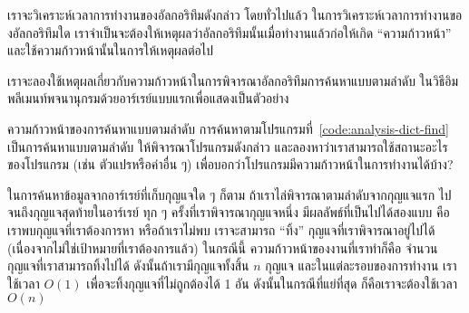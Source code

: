 เรา{\wbr}จะ{\wbr}วิเคราะห์{\wbr}เวลา{\wbr}การ{\wbr}ทำงาน{\wbr}ของ{\wbr}อัล{\wbr}กอ{\wbr}ริ{\wbr}ทึม{\wbr}ดังกล่าว โดย{\wbr}ทั่วไป{\wbr}แล้ว{\wbr}
ใน{\wbr}การ{\wbr}วิเคราะห์{\wbr}เวลา{\wbr}การ{\wbr}ทำงาน{\wbr}ของ{\wbr}อัล{\wbr}กอ{\wbr}ริ{\wbr}ทึม{\wbr}ใด{\wbr}
เรา{\wbr}จำเป็น{\wbr}จะ{\wbr}ต้อง{\wbr}ให้{\wbr}เหตุผล{\wbr}ว่า{\wbr}อัล{\wbr}กอ{\wbr}ริ{\wbr}ทึม{\wbr}นั้น{\wbr}เมื่อ{\wbr}ทำงาน{\wbr}แล้ว{\wbr}ก่อ{\wbr}ให้{\wbr}เกิด ``ความ{\wbr}ก้าวหน้า''
และ{\wbr}ใช้{\wbr}ความ{\wbr}ก้าวหน้า{\wbr}นั้น{\wbr}ใน{\wbr}การ{\wbr}ให้{\wbr}เหตุผล{\wbr}ต่อไป{\wbr}

เรา{\wbr}จะ{\wbr}ลอง{\wbr}ใช้{\wbr}เหตุผล{\wbr}เกี่ยวกับ{\wbr}ความ{\wbr}ก้าวหน้า{\wbr}ใน{\wbr}การ{\wbr}พิจารณา{\wbr}อัล{\wbr}กอ{\wbr}ริ{\wbr}ทึม{\wbr}การ{\wbr}ค้นหา{\wbr}แบบ{\wbr}ตาม{\wbr}ลำดับ{\wbr}
ใน{\wbr}วิธี{\wbr}อิม{\wbr}พลี{\wbr}เมนท์{\wbr}พจนานุกรม{\wbr}ด้วย{\wbr}อาร์เรย์{\wbr}แบบ{\wbr}แรก{\wbr}เพื่อ{\wbr}แสดง{\wbr}เป็น{\wbr}ตัวอย่าง{\wbr}

\begin{quiz}{ความ{\wbr}ก้าวหน้า{\wbr}ของ{\wbr}การ{\wbr}ค้นหา{\wbr}แบบ{\wbr}ตาม{\wbr}ลำดับ}
การ{\wbr}ค้นหา{\wbr}ตาม{\wbr}โปรแกรม{\wbr}ที่~\ref{code:analysis-dict-find} เป็น{\wbr}การ{\wbr}ค้นหา{\wbr}แบบ{\wbr}ตาม{\wbr}ลำดับ{\wbr}
ให้{\wbr}พิจารณา{\wbr}โปรแกรม{\wbr}ดังกล่าว และ{\wbr}ลอง{\wbr}หาว่า{\wbr}เรา{\wbr}สามารถ{\wbr}ใช้{\wbr}สถานะ{\wbr}อะไร{\wbr}ของ{\wbr}โปรแกรม (เช่น{\wbr}
ตัวแปร{\wbr}หรือ{\wbr}ค่า{\wbr}อื่น ๆ) เพื่อ{\wbr}บอก{\wbr}ว่า{\wbr}โปรแกรม{\wbr}มี{\wbr}ความ{\wbr}ก้าวหน้า{\wbr}ใน{\wbr}การ{\wbr}ทำงาน{\wbr}ได้{\wbr}บ้าง?
\end{quiz}

ใน{\wbr}การ{\wbr}ค้นหา{\wbr}ข้อมูล{\wbr}จาก{\wbr}อาร์เรย์{\wbr}ที่{\wbr}เก็บ{\wbr}กุญแจ{\wbr}ใด ๆ ก็ตาม ถ้า{\wbr}เรา{\wbr}ไล่{\wbr}พิจารณา{\wbr}ตาม{\wbr}ลำดับ{\wbr}จาก{\wbr}กุญแจ{\wbr}แรก{\wbr}
ไป{\wbr}จนถึง{\wbr}กุญแจ{\wbr}สุดท้าย{\wbr}ใน{\wbr}อาร์เรย์ ทุก ๆ ครั้ง{\wbr}ที่{\wbr}เรา{\wbr}พิจารณา{\wbr}กุญแจ{\wbr}หนึ่ง มี{\wbr}ผลลัพธ์{\wbr}ที่{\wbr}เป็น{\wbr}ไป{\wbr}ได้{\wbr}สอง{\wbr}แบบ{\wbr}
คือ เรา{\wbr}พบ{\wbr}กุญแจ{\wbr}ที่{\wbr}เรา{\wbr}ต้องการ{\wbr}หา หรือ{\wbr}ถ้า{\wbr}เรา{\wbr}ไม่{\wbr}พบ เรา{\wbr}จะ{\wbr}สามารถ ``ทิ้ง''
กุญแจ{\wbr}ที่{\wbr}เรา{\wbr}พิจารณา{\wbr}อยู่{\wbr}ไป{\wbr}ได้ (เนื่องจาก{\wbr}ไม่{\wbr}ใช่{\wbr}เป้าหมาย{\wbr}ที่{\wbr}เรา{\wbr}ต้องการ{\wbr}แล้ว) ใน{\wbr}กรณี{\wbr}นี้{\wbr}
ความ{\wbr}ก้าวหน้า{\wbr}ของ{\wbr}งาน{\wbr}ที่{\wbr}เรา{\wbr}ทำ{\wbr}ก็{\wbr}คือ จำนวน{\wbr}กุญแจ{\wbr}ที่{\wbr}เรา{\wbr}สามารถ{\wbr}ทิ้ง{\wbr}ไป{\wbr}ได้ ดังนั้น{\wbr}ถ้า{\wbr}เรา{\wbr}มี{\wbr}กุญแจ{\wbr}ทั้งสิ้น{\wbr}
$n$ กุญแจ และ{\wbr}ใน{\wbr}แต่ละ{\wbr}รอบ{\wbr}ของ{\wbr}การ{\wbr}ทำงาน เรา{\wbr}ใช้เวลา $O(1)$
เพื่อ{\wbr}จะ{\wbr}ทิ้ง{\wbr}กุญแจ{\wbr}ที่{\wbr}ไม่{\wbr}ถูกต้อง{\wbr}ได้ 1 อัน ดังนั้น{\wbr}ใน{\wbr}กรณี{\wbr}ที่{\wbr}แย่{\wbr}ที่สุด ก็{\wbr}คือ{\wbr}เรา{\wbr}จะ{\wbr}ต้อง{\wbr}ใช้เวลา $O(n)$

